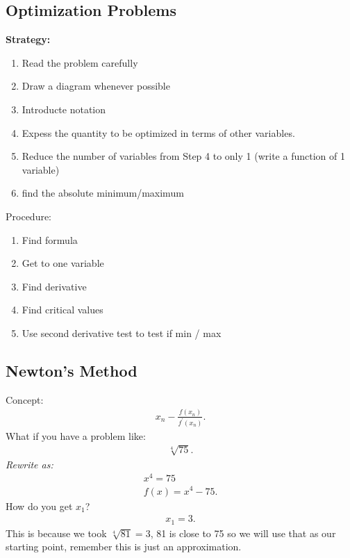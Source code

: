 \documentclass{report}
\begin{document}
    \bigbreak \noindent \bigbreak \noindent 
    \subsection{Optimization Problems}
    \bigbreak \noindent 
    \textbf{Strategy:}
    \begin{enumerate}
      \item Read the problem carefully
      \item Draw a diagram whenever possible 
      \item Introducte notation
      \item Expess the quantity to be optimized in terms of other variables.
      \item Reduce the number of variables from Step 4 to only 1 (write a function of 1 variable)
      \item find the absolute minimum/maximum
    \end{enumerate}
    \bigbreak \noindent 
    Procedure:
    \begin{enumerate}
      \item Find formula
      \item Get to one variable
      \item Find derivative
      \item Find critical values
      \item Use second derivative test to test if min / max
    \end{enumerate}

    \bigbreak \noindent \bigbreak \noindent 
    \subsection{Newton's Method}
    \bigbreak \noindent 
    Concept:
    \begin{align*}
      x_{n} - \frac{f(x_n)}{f^{\prime}(x_n)}
    .\end{align*}
    \bigbreak \noindent 
    What if you have a problem like:
    \begin{align*}
      \sqrt[4]{75}
    .\end{align*}
    \bigbreak \noindent 
    \textit{Rewrite as:}
    \begin{align*}
      x^{4} = 75 \\
      f(x) = x^{4}-75
    .\end{align*}
    \bigbreak \noindent 
    How do you get $x_1$?
    \begin{align*}
      x_1 =3
    .\end{align*}
    \bigbreak \noindent 
    This is because we took $\sqrt[4]{81} =3$, 81 is close to 75 so we will use that as our starting point, remember this is just an approximation.
\end{document}
